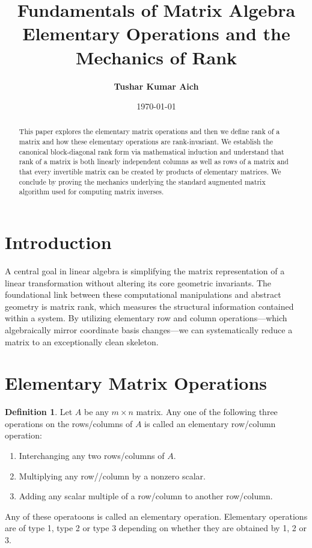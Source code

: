 \documentclass[12pt, a4paper]{article}
\title{\textbf{\Large Fundamentals of Matrix Algebra \\ \large Elementary Operations and the Mechanics of Rank}}
\author{\textbf{Tushar Kumar Aich}}
\date{\today}
\theoremstyle{definition}
\newtheorem{definition}{Definition}[section]
\theoremstyle{remark}
\begin{document}
\maketitle

\begin{abstract}
    This paper explores the elementary matrix operations and then we define rank of a matrix and how these elementary operations are rank-invariant. We establish the canonical block-diagonal rank form via mathematical induction and understand that rank of a matrix is both linearly independent columns as well as rows of a matrix and that every invertible matrix can be created by products of elementary matrices. We conclude by proving the mechanics underlying the standard augmented matrix algorithm used for computing matrix inverses.
\end{abstract}

\section{Introduction}
A central goal in linear algebra is simplifying the matrix representation of a linear transformation without altering its core geometric invariants. The foundational link between these computational manipulations and abstract geometry is matrix rank, which measures the structural information contained within a system. By utilizing elementary row and column operations—which algebraically mirror coordinate basis changes—we can systematically reduce a matrix to an exceptionally clean skeleton. 

\section{Elementary Matrix Operations}
\begin{definition}
    Let $A$ be any $m \times n$ matrix. Any one of the following three operations on the rows/columns of $A$ is called an elementary row/column operation:
    \begin{enumerate}
        \item Interchanging any two rows/columns of $A$.
        \item Multiplying any row//column by a nonzero scalar.
        \item Adding any scalar multiple of a row/column to another row/column.
    \end{enumerate}
\end{definition}

Any of these operatoons is called an elementary operation. Elementary operations are of type 1, type 2 or type 3 depending on whether they are obtained by 1, 2 or 3.
\end{document}
